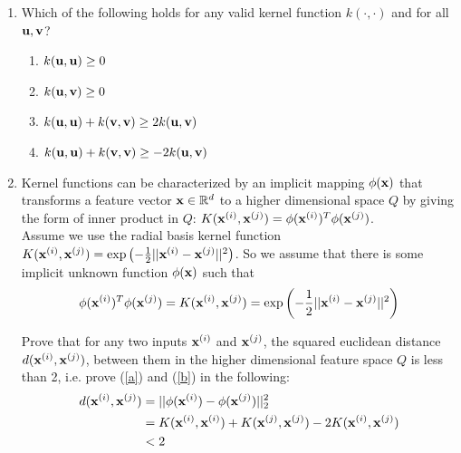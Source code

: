 \documentclass[11pt]{article}
\begin{document}
\newpage
{}

\begin{enumerate}
\item {} Which of the following holds for any valid kernel function $k(\cdot,\cdot)$ and for all ${\mathbf u},{\mathbf v}$?
\begin{enumerate}
    \item $k({\mathbf u},{\mathbf u})\ge 0$
    \item $k({\mathbf u},{\mathbf v})\ge 0$
    \item $k({\mathbf u}, {\mathbf u}) + k({\mathbf v}, {\mathbf v})\ge 2k({\mathbf u}, {\mathbf v})$
    \item $k({\mathbf u}, {\mathbf u}) + k({\mathbf v}, {\mathbf v})\ge -2k({\mathbf u}, {\mathbf v})$
\end{enumerate} \vspace{2cm}


\item {}
Kernel functions can be characterized by an implicit mapping $\phi({\mathbf x})$ that transforms a feature vector ${\mathbf x}\in \mathbb{R}^d$ to a higher dimensional space $Q$ by giving the form of inner product in $Q$: $K({\mathbf x}^{(i)},{\mathbf x}^{(j)})=\phi({\mathbf x}^{(i)})^T\phi({\mathbf x}^{(j)})$.\\
Assume we use the radial basis kernel function $K({\mathbf x}^{(i)},{\mathbf x}^{(j)})=\exp\left(-\frac{1}{2}||{\mathbf x}^{(i)}-{\mathbf x}^{(j)}||^2\right)$. So we assume that there is some implicit unknown function $\phi({\mathbf x})$ such that $$\phi({\mathbf x}^{(i)})^T\phi({\mathbf x}^{(j)})=K({\mathbf x}^{(i)},{\mathbf x}^{(j)})=\exp\left(-\frac{1}{2}||{\mathbf x}^{(i)}-{\mathbf x}^{(j)}||^2\right)$$

Prove that for any two inputs ${\mathbf x}^{(i)}$ and ${\mathbf x}^{(j)}$, the squared euclidean distance $d({\mathbf x}^{(i)},{\mathbf x}^{(j)})$, between them in the higher dimensional feature space $Q$ is less than 2, i.e. prove (\ref{a}) and (\ref{b}) in the following:
    \begin{align}
    d({\mathbf x}^{(i)},{\mathbf x}^{(j)})& =||\phi({\mathbf x}^{(i)})-\phi({\mathbf x}^{(j)})||_2^2 \nonumber\\
    & = K({\mathbf x}^{(i)},{\mathbf x}^{(i)})+K({\mathbf x}^{(j)},{\mathbf x}^{(j)})-2K({\mathbf x}^{(i)},{\mathbf x}^{(j)}) \label{a}\\
    & <2 \label{b}
    \end{align}
\end{enumerate}
\newpage


\end{document}
